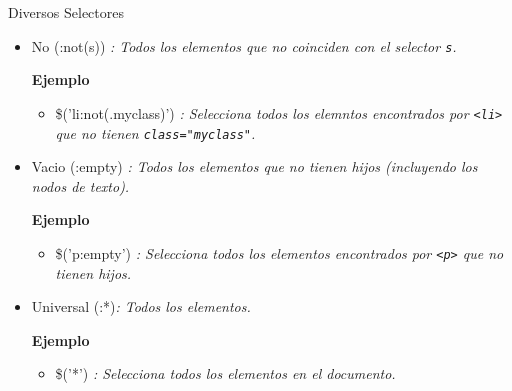 \begin{frame}[fragile]{Diversos Selectores} %
\begin{itemize}
    \item No (:not(s)) \textit{: Todos los elementos que no coinciden con el
    selector \texttt{s}.}
    
    \textbf{Ejemplo}
    \begin{itemize}
        \item \$('li:not(.myclass)') \textit{: Selecciona todos los elemntos
        encontrados por \texttt{<li>} que no tienen \texttt{class="myclass"}.}
    \end{itemize}
    \item Vacio (:empty) \textit{: Todos los elementos que no tienen hijos
    (incluyendo los nodos de texto).}
    
    \textbf{Ejemplo}
    \begin{itemize}
        \item \$('p:empty') \textit{: Selecciona todos los elementos
        encontrados por \texttt{<p>} que no tienen hijos.}
    \end{itemize}
    \item Universal (:*)\textit{: Todos los elementos.}
    
    \textbf{Ejemplo}
    \begin{itemize}
        \item \$('*') \textit{: Selecciona todos los elementos en el documento.}
    \end{itemize}
\end{itemize}
\end{frame}



